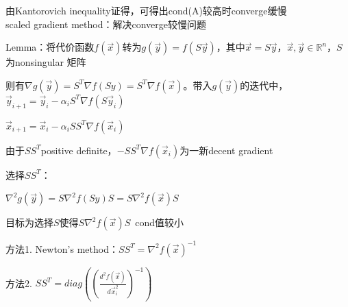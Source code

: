 \documentclass[UTF8]{ctexart}
\begin{document}
  \quad 由Kantorovich inequality证得，可得出cond(A)较高时converge缓慢\\
scaled gradient method：解决converge较慢问题

  Lemma：将代价函数$f(\vec{x})$转为$g(\vec{y}) = f(S\vec{y})$，其中$\vec{x} = S\vec{y}$，$\vec{x}, \vec{y} \in \mathbb{R}^n$，$S$为nonsingular 矩阵

  \quad 则有$\nabla g(\vec{y}) = S^T\nabla f(Sy) = S^T\nabla f(\vec{x})$。带入$g(\vec{y})$的迭代中，$\vec{y}_{i+1} = \vec{y}_i - \alpha_i S^T\nabla f(S\vec{y}_i)$

  \quad $\vec{x}_{i+1} = \vec{x}_i - \alpha_i SS^T\nabla f(\vec{x}_i)$

  \quad 由于$SS^T$positive definite，$-SS^T\nabla f(\vec{x}_i)$为一新decent gradient

  选择$SS^T$：

  \quad $\nabla^2 g(\vec{y}) = S\nabla^2f(Sy)S = S\nabla^2f(\vec{x})S$

  \quad 目标为选择$S$使得$S\nabla^2f(\vec{x})S$\ cond值较小

  \quad \quad 方法1. Newton's method：$SS^T = \nabla^2f(\vec{x})^{-1}$

  \quad \quad 方法2. $SS^T = diag((\frac{d^2 f(\vec{x})}{d\vec{x}_i^2})^{-1})$

  

  
  
\end{document}
